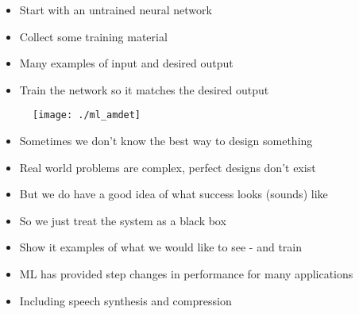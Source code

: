 \documentclass{beamer}
\begin{document}
\begin{frame}
\begin{itemize}
	\item Start with an untrained neural network
	\item Collect some training material
	\item Many examples of input and desired output
	\item Train the network so it matches the desired output
\end{itemize}



\end{frame}

\begin{frame}

\begin{figure}
\centering
\texttt{[image: ./ml\_amdet]}
\end{figure}
  
\end{frame}

\begin{frame}
\begin{itemize}
	\item Sometimes we don't know the best way to design something
	\item Real world problems are complex, perfect designs don't exist
	\item But we do have a good idea of what success looks (sounds) like
	\item So we just treat the system as a black box
	\item Show it examples of what we would like to see - and train
	\item ML has provided step changes in performance for many applications
	\item Including speech synthesis and compression
\end{itemize}
\end{frame}
\end{document}
